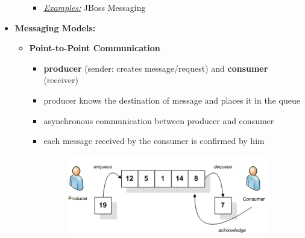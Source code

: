 \documentclass[ieeetran]{article}
\begin{document}
\begin{itemize}
\begin{itemize}
\begin{itemize}
		\item \textit{\underline{Examples:}} JBoss Messaging
	\end{itemize}
	\end{itemize}


\pagebreak

\item \textbf{Messaging Models:}
	\begin{itemize}
	  \item \textbf{Point-to-Point Communication}
		  \begin{itemize}
			  \item \textbf{producer} (sender: creates message/request) and \textbf{consumer} (receiver)
		\item producer knows the destination of message and places it in the queue
		\item asynchronous communication between producer and consumer
		\item each message received by the consumer is confirmed by him
\begin{figure}[h!]
  \centering
  \includegraphics[width=0.5\linewidth]{pointtopoint.png}
  \label{fig:pointtopoint_png}
\end{figure}
		  \end{itemize}


\end{itemize}
\end{itemize}
\end{document}
